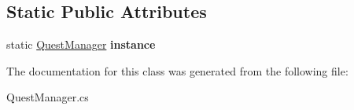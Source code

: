 \subsection*{Static Public Attributes}
\begin{DoxyCompactItemize}
\item 
\mbox{\label{class_quest_manager_a087ca5b7f4ee95b23b48c7a0c6bc945a}} 
static \mbox{\hyperlink{class_quest_manager}{Quest\+Manager}} {\bfseries instance}
\end{DoxyCompactItemize}


The documentation for this class was generated from the following file\+:\begin{DoxyCompactItemize}
\item 
Quest\+Manager.\+cs\end{DoxyCompactItemize}
